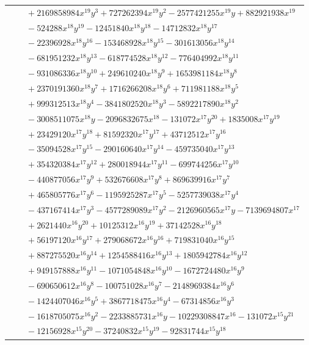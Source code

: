 \documentclass[11pt]{article}
\begin{document}
\begin{longtable}{@{}ll@{}}
 & $\quad +2169858984x^{19}y^{3}+727262394x^{19}y^{2}-2577421255x^{19}y+882921938x^{19}$\\
 & $\quad -524288x^{18}y^{19}-12451840x^{18}y^{18}-14712832x^{18}y^{17}$\\
 & $\quad -22396928x^{18}y^{16}-153468928x^{18}y^{15}-301613056x^{18}y^{14}$\\
 & $\quad -681951232x^{18}y^{13}-618774528x^{18}y^{12}-776404992x^{18}y^{11}$\\
 & $\quad -931086336x^{18}y^{10}+249610240x^{18}y^{9}+1653981184x^{18}y^{8}$\\
 & $\quad +2370191360x^{18}y^{7}+1716266208x^{18}y^{6}+711981188x^{18}y^{5}$\\
 & $\quad +999312513x^{18}y^{4}-3841802520x^{18}y^{3}-5892217890x^{18}y^{2}$\\
 & $\quad -3008511075x^{18}y-2096832675x^{18}-131072x^{17}y^{20}+1835008x^{17}y^{19}$\\
 & $\quad +23429120x^{17}y^{18}+81592320x^{17}y^{17}+43712512x^{17}y^{16}$\\
 & $\quad -35094528x^{17}y^{15}-290160640x^{17}y^{14}-459735040x^{17}y^{13}$\\
 & $\quad +354320384x^{17}y^{12}+280018944x^{17}y^{11}-699744256x^{17}y^{10}$\\
 & $\quad -440877056x^{17}y^{9}+532676608x^{17}y^{8}+869639916x^{17}y^{7}$\\
 & $\quad +465805776x^{17}y^{6}-1195925287x^{17}y^{5}-5257739038x^{17}y^{4}$\\
 & $\quad -437167414x^{17}y^{3}-4577289089x^{17}y^{2}-2126960565x^{17}y-7139694807x^{17}$\\
 & $\quad +2621440x^{16}y^{20}+10125312x^{16}y^{19}+37142528x^{16}y^{18}$\\
 & $\quad +56197120x^{16}y^{17}+279068672x^{16}y^{16}+719831040x^{16}y^{15}$\\
 & $\quad +887275520x^{16}y^{14}+1254588416x^{16}y^{13}+1805942784x^{16}y^{12}$\\
 & $\quad +949157888x^{16}y^{11}-1071054848x^{16}y^{10}-1672724480x^{16}y^{9}$\\
 & $\quad -690650612x^{16}y^{8}-100751028x^{16}y^{7}-2148969384x^{16}y^{6}$\\
 & $\quad -1424407046x^{16}y^{5}+3867718475x^{16}y^{4}-67314856x^{16}y^{3}$\\
 & $\quad -1618705075x^{16}y^{2}-2233885731x^{16}y-10229308847x^{16}-131072x^{15}y^{21}$\\
 & $\quad -12156928x^{15}y^{20}-37240832x^{15}y^{19}-92831744x^{15}y^{18}$\\

\end{longtable}
\end{document}
